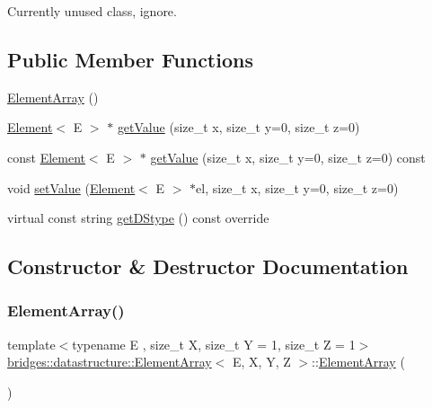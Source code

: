 Currently unused class, ignore. \subsection*{Public Member Functions}
\begin{DoxyCompactItemize}
\item 
\hyperlink{classbridges_1_1datastructure_1_1_element_array_ae86caf35a947e3b34a2d2bd421e414eb}{Element\+Array} ()
\item 
\hyperlink{classbridges_1_1datastructure_1_1_element}{Element}$<$ E $>$ $\ast$ \hyperlink{classbridges_1_1datastructure_1_1_element_array_a383d08e16eeeb06217d030ed2b18fb37}{get\+Value} (size\+\_\+t x, size\+\_\+t y=0, size\+\_\+t z=0)
\item 
const \hyperlink{classbridges_1_1datastructure_1_1_element}{Element}$<$ E $>$ $\ast$ \hyperlink{classbridges_1_1datastructure_1_1_element_array_a1b05a90e5611a83a4a0c2b535d134303}{get\+Value} (size\+\_\+t x, size\+\_\+t y=0, size\+\_\+t z=0) const
\item 
void \hyperlink{classbridges_1_1datastructure_1_1_element_array_aecd1e6ae5a15c74837f2bfe9d7fbeb60}{set\+Value} (\hyperlink{classbridges_1_1datastructure_1_1_element}{Element}$<$ E $>$ $\ast$el, size\+\_\+t x, size\+\_\+t y=0, size\+\_\+t z=0)
\item 
virtual const string \hyperlink{classbridges_1_1datastructure_1_1_element_array_a22d8c37e88616105cdb7c755f99fdb20}{get\+D\+Stype} () const override
\end{DoxyCompactItemize}


\subsection{Constructor \& Destructor Documentation}
\mbox{\label{classbridges_1_1datastructure_1_1_element_array_ae86caf35a947e3b34a2d2bd421e414eb}} 
\subsubsection{\texorpdfstring{Element\+Array()}{ElementArray()}}
{\footnotesize\ttfamily template$<$typename E , size\+\_\+t X, size\+\_\+t Y = 1, size\+\_\+t Z = 1$>$ \\
\hyperlink{classbridges_1_1datastructure_1_1_element_array}{bridges\+::datastructure\+::\+Element\+Array}$<$ E, X, Y, Z $>$\+::\hyperlink{classbridges_1_1datastructure_1_1_element_array}{Element\+Array} (\begin{DoxyParamCaption}{ }\end{DoxyParamCaption})\hspace{0.3cm}{\ttfamily [inline]}}



